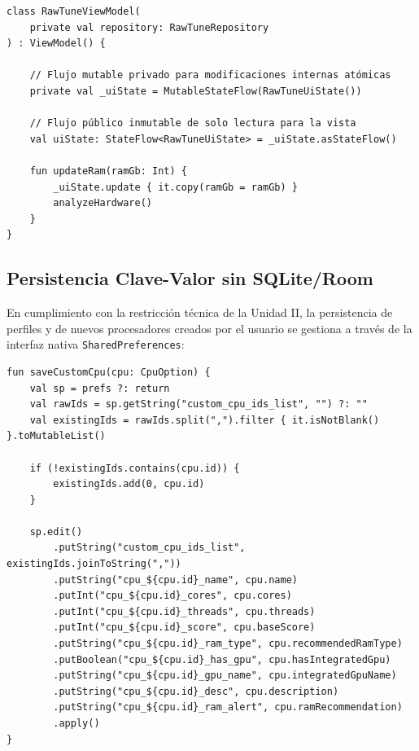 \documentclass[12pt,a4paper]{article}
\begin{document}
\begin{lstlisting}[caption={Patrón Backing Property en RawTuneViewModel.kt}]
class RawTuneViewModel(
    private val repository: RawTuneRepository
) : ViewModel() {

    // Flujo mutable privado para modificaciones internas atómicas
    private val _uiState = MutableStateFlow(RawTuneUiState())
    
    // Flujo público inmutable de solo lectura para la vista
    val uiState: StateFlow<RawTuneUiState> = _uiState.asStateFlow()

    fun updateRam(ramGb: Int) {
        _uiState.update { it.copy(ramGb = ramGb) }
        analyzeHardware()
    }
}
\end{lstlisting}

\subsection{Persistencia Clave-Valor sin SQLite/Room}
En cumplimiento con la restricción técnica de la Unidad II, la persistencia de perfiles y de nuevos procesadores creados por el usuario se gestiona a través de la interfaz nativa \texttt{SharedPreferences}:

\begin{lstlisting}[caption={Persistencia de procesadores en RawTuneLocalDataSource.kt}]
fun saveCustomCpu(cpu: CpuOption) {
    val sp = prefs ?: return
    val rawIds = sp.getString("custom_cpu_ids_list", "") ?: ""
    val existingIds = rawIds.split(",").filter { it.isNotBlank() }.toMutableList()
    
    if (!existingIds.contains(cpu.id)) {
        existingIds.add(0, cpu.id)
    }

    sp.edit()
        .putString("custom_cpu_ids_list", existingIds.joinToString(","))
        .putString("cpu_${cpu.id}_name", cpu.name)
        .putInt("cpu_${cpu.id}_cores", cpu.cores)
        .putInt("cpu_${cpu.id}_threads", cpu.threads)
        .putInt("cpu_${cpu.id}_score", cpu.baseScore)
        .putString("cpu_${cpu.id}_ram_type", cpu.recommendedRamType)
        .putBoolean("cpu_${cpu.id}_has_gpu", cpu.hasIntegratedGpu)
        .putString("cpu_${cpu.id}_gpu_name", cpu.integratedGpuName)
        .putString("cpu_${cpu.id}_desc", cpu.description)
        .putString("cpu_${cpu.id}_ram_alert", cpu.ramRecommendation)
        .apply()
}
\end{lstlisting}

\end{document}
